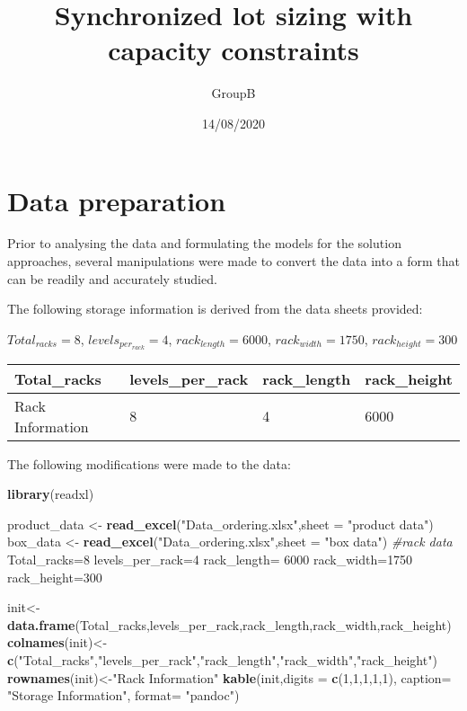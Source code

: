 \documentclass[
]{article}
\title{Synchronized lot sizing with capacity constraints}
\author{GroupB}
\date{14/08/2020}
\newenvironment{Shaded}{\begin{snugshade}}{\end{snugshade}}
\newcommand{\CommentTok}[1]{\textcolor[rgb]{0.56,0.35,0.01}{\textit{#1}}}
\newcommand{\DataTypeTok}[1]{\textcolor[rgb]{0.13,0.29,0.53}{#1}}
\newcommand{\DecValTok}[1]{\textcolor[rgb]{0.00,0.00,0.81}{#1}}
\newcommand{\KeywordTok}[1]{\textcolor[rgb]{0.13,0.29,0.53}{\textbf{#1}}}
\newcommand{\NormalTok}[1]{#1}
\newcommand{\StringTok}[1]{\textcolor[rgb]{0.31,0.60,0.02}{#1}}
\begin{document}
\maketitle

\hypertarget{data-preparation}{%
\section{Data preparation}\label{data-preparation}}

Prior to analysing the data and formulating the models for the solution
approaches, several manipulations were made to convert the data into a
form that can be readily and accurately studied.

The following storage information is derived from the data sheets
provided:

\(Total_{racks}=8\), \(levels_{per_{rack}}=4\), \(rack_{length}= 6000\),
\(rack_{width}=1750\), \(rack_{height}=300\)

\begin{longtable}[]{@{}llll@{}}
\toprule
Total\_racks & levels\_per\_rack & rack\_length &
rack\_height\tabularnewline
\midrule
\endhead
Rack Information & 8 & 4 & 6000\tabularnewline
\bottomrule
\end{longtable}

The following modifications were made to the data:

\begin{Shaded}
\begin{Highlighting}[]
\KeywordTok{library}\NormalTok{(readxl)}

\NormalTok{product_data <-}\StringTok{ }\KeywordTok{read_excel}\NormalTok{(}\StringTok{"Data_ordering.xlsx"}\NormalTok{,}\DataTypeTok{sheet =} \StringTok{"product data"}\NormalTok{)}
\NormalTok{box_data <-}\StringTok{ }\KeywordTok{read_excel}\NormalTok{(}\StringTok{"Data_ordering.xlsx"}\NormalTok{,}\DataTypeTok{sheet =} \StringTok{"box data"}\NormalTok{)}
\CommentTok{#rack data}
\NormalTok{Total_racks=}\DecValTok{8}
\NormalTok{levels_per_rack=}\DecValTok{4}
\NormalTok{rack_length=}\StringTok{ }\DecValTok{6000}
\NormalTok{rack_width=}\DecValTok{1750}
\NormalTok{rack_height=}\DecValTok{300}

\NormalTok{init<-}\StringTok{ }\KeywordTok{data.frame}\NormalTok{(Total_racks,levels_per_rack,rack_length,rack_width,rack_height)}
\KeywordTok{colnames}\NormalTok{(init)<-}\StringTok{ }\KeywordTok{c}\NormalTok{(}\StringTok{"Total_racks"}\NormalTok{,}\StringTok{"levels_per_rack"}\NormalTok{,}\StringTok{"rack_length"}\NormalTok{,}\StringTok{"rack_width"}\NormalTok{,}\StringTok{"rack_height"}\NormalTok{)}
\KeywordTok{rownames}\NormalTok{(init)<-}\StringTok{"Rack Information"}
\KeywordTok{kable}\NormalTok{(init,}\DataTypeTok{digits =} \KeywordTok{c}\NormalTok{(}\DecValTok{1}\NormalTok{,}\DecValTok{1}\NormalTok{,}\DecValTok{1}\NormalTok{,}\DecValTok{1}\NormalTok{,}\DecValTok{1}\NormalTok{), }\DataTypeTok{caption=} \StringTok{"Storage Information"}\NormalTok{, }\DataTypeTok{format=} \StringTok{"pandoc"}\NormalTok{)}
\end{Highlighting}
\end{Shaded}
\end{document}
